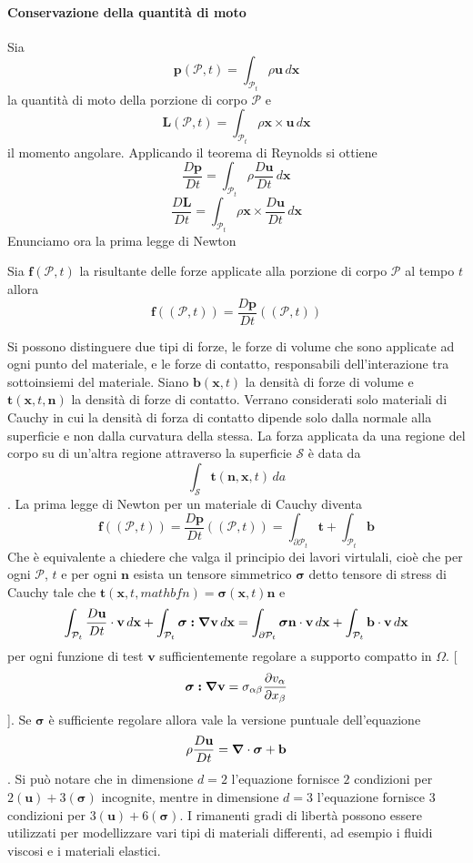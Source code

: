 \paragraph{Conservazione della quantità di moto}
Sia
$$\mathbf{p}(\mathcal{P},t)=\int_{\mathcal{P}_t}\rho\mathbf{u}\,d\mathbf{x}$$
la quantità di moto della porzione di corpo $\mathcal{P}$
e
$$\mathbf{L}(\mathcal{P},t)=\int_{\mathcal{P}_t}\rho\mathbf{x}\times\mathbf{u}\,d\mathbf{x}$$
il momento angolare.
Applicando il teorema di Reynolds si ottiene
$$\frac{D\mathbf{p}}{Dt}=\int_{\mathcal{P}_t}\rho\frac{D\mathbf{u}}{Dt}\,d\mathbf{x}$$
$$\frac{D\mathbf{L}}{Dt}=\int_{\mathcal{P}_t}\rho\mathbf{x}\times\frac{D\mathbf{u}}{Dt}\,d\mathbf{x}$$
Enunciamo ora la prima legge di Newton
\begin{theorem}
	Sia $\mathbf{f}(\mathcal{P},t)$ la risultante delle forze applicate alla porzione di corpo $\mathcal{P}$ al tempo $t$ allora
	$$\mathbf{f}((\mathcal{P},t))=\frac{D\mathbf{p}}{Dt}((\mathcal{P},t))$$
\end{theorem}
Si possono distinguere due tipi di forze, le forze di volume che sono applicate ad ogni punto del materiale, e le forze di contatto, responsabili dell'interazione tra sottoinsiemi del materiale.
Siano $\mathbf{b}(\mathbf{x},t)$ la densità di forze di volume e $\mathbf{t}(\mathbf{x},t,\mathbf{n})$ la densità di forze di contatto. Verrano considerati solo materiali di Cauchy in cui la densità di forza di contatto dipende solo dalla normale alla superficie e non dalla curvatura della stessa.
La forza applicata da una regione del corpo su di un'altra regione attraverso la superficie $\mathcal{S}$ è data da
$$\int_{\mathcal{S}}\mathbf{t}(\mathbf{n},\mathbf{x},t)\,da$$.
La prima legge di Newton per un materiale di Cauchy diventa
$$\mathbf{f}((\mathcal{P},t))=\frac{D\mathbf{p}}{Dt}((\mathcal{P},t)) = \int_{\partial\mathcal{P}_t}\mathbf{t}+\int_{\mathcal{P}_t}\mathbf{b}$$
Che è equivalente a chiedere che valga il principio dei lavori virtulali, cioè che per ogni $\mathcal{P}$, $t$ e per ogni $\mathbf{n}$ esista un tensore simmetrico $\boldsymbol{\sigma}$ detto tensore di stress di Cauchy tale che $\mathbf{t}(\mathbf{x},t,mathbf{n})=\boldsymbol{\sigma}(\mathbf{x},t)\mathbf{n}$ e
$$\int_{\mathcal{P}_t}\frac{D\mathbf{u}}{Dt}\cdot\mathbf{v}\,d\mathbf{x}+\int_{\mathcal{P}_t}\boldsymbol{\sigma}\boldsymbol{:}\boldsymbol{\nabla}\mathbf{v}\,d\mathbf{x}=\int_{\partial\mathcal{P}_t}\boldsymbol{\sigma}\mathbf{n}\cdot\mathbf{v}\,d\mathbf{x}+\int_{\mathcal{P}_t}\mathbf{b}\cdot\mathbf{v}\,d\mathbf{x}$$
per ogni funzione di test $\mathbf{v}$ sufficientemente regolare a supporto compatto in $\Omega$.
[$$\boldsymbol{\sigma}\boldsymbol{:}\boldsymbol{\nabla}\mathbf{v}=\sigma_{\alpha\beta}\frac{\partial v_{\alpha}}{\partial x_{\beta}}$$].
Se $\boldsymbol{\sigma}$ è sufficiente regolare allora vale la versione puntuale dell'equazione
$$\rho\frac{D\mathbf{u}}{Dt}=\boldsymbol{\nabla}\cdot\boldsymbol{\sigma}+\mathbf{b}$$.
Si può notare che in dimensione $d=2$ l'equazione fornisce $2$ condizioni per $2(\mathbf{u})+3(\boldsymbol{\sigma})$ incognite, mentre in dimensione $d=3$ l'equazione fornisce $3$ condizioni per $3(\mathbf{u})+6(\boldsymbol{\sigma})$.
I rimanenti gradi di libertà possono essere utilizzati per modellizzare vari tipi di materiali differenti, ad esempio i fluidi viscosi e i materiali elastici.


